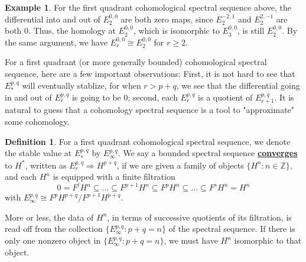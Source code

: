 \documentclass{article}
\theoremstyle{definition}
\theoremstyle{definition}
\theoremstyle{definition}
\theoremstyle{definition}
\theoremstyle{definition}
\newtheorem{definition}{Definition}[section]
\theoremstyle{definition}
\theoremstyle{definition}
\newtheorem{example}{Example}[section]
\begin{document}

\begin{tcolorbox}[colback=yellow!5!white,colframe=yellow!30!white]
\begin{example}
	For the first quadrant cohomological spectral sequence above, the differential into and out of $E_2^{0,0}$ are both zero maps, since $E_2^{-2,1}$ and $E_2^{2,-1}$ are both $0$. Thus, the homology at $E_2^{0,0}$, which is isomorphic to $E_3^{0,0}$, is still $E_2^{0,0}$. By the same argument, we have $E_r^{0,0}\cong E_2^{0,0}$ for $r\geq 2$. 
\end{example}
\end{tcolorbox}


For a first quadrant (or more generally bounded) cohomological spectral sequence, here are a few important observations: First, it is not hard to see that $E_*^{p,q}$ will eventually stablize, for when $r>{p+q}$, we see that the differential going in and out of $E_r^{p,q}$ is going to be $0$; second, each $E_r^{p,q}$ is a quotient of $E_{r+1}^{p,q}$. It is natural to guess that a cohomology spectral sequence is a tool to "approximate" some cohomology. 


\begin{tcolorbox}[colback=purple!5!white,colframe=purple!75!black]
\begin{definition}
For a first quadrant cohomological spectral sequence, we denote the stable value at $E_*^{p,q}$ by $E_{\infty}^{p,q}$. We say a bounded spectral sequence \underline{\textbf{converges}} to $H^*$, written as $E_r^{p,q}\Longrightarrow H^{p+q}$, if we are given a family of objects $\{H^n: n\in \mathbb{Z}\}$, and each $H^n$ is equipped with a finite filtration
\[
0=F^tH^n\subseteq ...\subseteq F^{p+1}H^n\subseteq F^pH^n\subseteq ...\subseteq F^sH^n=H^n
\] 
with $E^{p,q}_{\infty}\cong F^pH^{p+q}/F^{p+1}H^{p+q}$. 
\end{definition}
\end{tcolorbox}
More or less, the data of $H^n$, in terms of successive quotients of its filtration, is read off from the collection $\{E_{\infty}^{p,q}: p+q=n\}$ of the spectral sequence. If there is only one nonzero object in $\{E_{\infty}^{p,q}: p+q=n\}$, we must have $H^n$ isomorphic to that object. 
\end{document}
